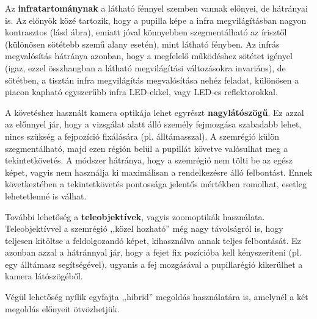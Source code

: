 Az \textbf{infratartománynak} a látható fénnyel szemben vannak előnyei, de hátrányai is. Az előnyök közé tartozik, hogy a pupilla képe a infra megvilágításban nagyon kontrasztos (lásd  ábra), emiatt jóval könnyebben szegmentálható az írisztől (különösen sötétebb szemű alany esetén), mint látható fényben. Az infrás megvalósítás hátránya azonban, hogy a megfelelő működéshez sötétet igényel (igaz, ezzel összhangban a látható megvilágítási változásokra invariáns), de sötétben, a tisztán infra megvilágítás megvalósítása nehéz feladat, különösen a piacon kapható egyszerűbb infra LED-ekkel, vagy LED-es reflektorokkal.

\bigskip

A követéshez használt kamera optikája lehet egyrészt \textbf{nagylátószögű}. Ez azzal az előnnyel jár, hogy a vizsgálat alatt álló személy fejmozgása szabadabb lehet, nincs szükség a fejpozíció fixálására (pl. álltámasszal). A szemrégió külön szegmentálható, majd ezen régión belül a pupillát követve valósulhat meg a tekintetkövetés. A módszer hátránya, hogy a szemrégió nem tölti be az egész képet, vagyis nem használja ki maximálisan a rendelkezésre álló felbontást. Ennek következtében a tekintetkövetés pontossága jelentős mértékben romolhat, esetleg lehetetlenné is válhat.

További lehetőség a \textbf{teleobjektívek}, vagyis zoomoptikák használata. Teleobjektívvel a szemrégió ,,közel hozható'' még nagy távolságról is, hogy teljesen kitöltse a feldolgozandó képet, kihasználva annak teljes felbontását. Ez azonban azzal a hátránnyal jár, hogy a fejet fix pozícióba kell kényszeríteni (pl. egy álltámasz segítségével), ugyanis a fej mozgásával a pupillarégió kikerülhet a kamera látószögéből.

Végül lehetőség nyílik egyfajta ,,hibrid'' megoldás használatára is, amelynél a két megoldás előnyeit ötvözhetjük.